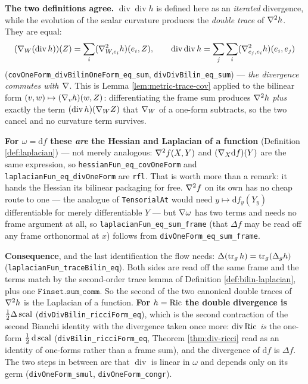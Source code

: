 \begin{definition}
  \textbf{The two definitions agree.} $\operatorname{div}\operatorname{div} h$
  is defined here as an \emph{iterated} divergence, while the evolution of the
  scalar curvature produces the \emph{double trace} of $\nabla^2h$. They are equal:
  \[
    (\nabla_W(\operatorname{div} h))(Z) = \sum_i (\nabla^2_{W,e_i}h)(e_i, Z),
    \qquad
    \operatorname{div}\operatorname{div} h
      = \sum_{j}\sum_i (\nabla^2_{e_j,e_i}h)(e_i, e_j)
  \]
  (\texttt{covOneForm\_divBilinOneForm\_eq\_sum},
  \texttt{divDivBilin\_eq\_sum}) --- \emph{the divergence commutes with
  $\nabla$}. This is Lemma \ref{lem:metric-trace-cov} applied to the bilinear
  form $(v,w) \mapsto (\nabla_v h)(w,Z)$: differentiating the frame sum produces
  $\nabla^2h$ \emph{plus} exactly the term $(\operatorname{div} h)(\nabla_W Z)$
  that $\nabla_W$ of a one-form subtracts, so the two cancel and no curvature
  term survives.

  \textbf{For $\omega = \mathrm{d}f$ these \emph{are} the Hessian and Laplacian
  of a function} (Definition \ref{def:laplacian}) --- not merely analogous:
  $\nabla^2 f(X,Y)$ and $(\nabla_X \mathrm{d}f)(Y)$ are the same expression, so
  \texttt{hessianFun\_eq\_covOneForm} and
  \texttt{laplacianFun\_eq\_divOneForm} are \texttt{rfl}. That is worth more
  than a remark: it hands the Hessian its bilinear packaging for free. $\nabla^2
  f$ on its own has no cheap route to one --- the analogue of
  \texttt{TensorialAt} would need $y \mapsto \mathrm{d}f_y(Y_y)$ differentiable
  for merely differentiable $Y$ --- but $\nabla\omega$ has two terms and needs no
  frame argument at all, so \texttt{laplacianFun\_eq\_sum\_frame} (that
  $\Delta f$ may be read off any frame orthonormal at $x$) follows from
  \texttt{divOneForm\_eq\_sum\_frame}.

  \textbf{Consequence}, and the last identification the flow needs:
  $\Delta(\operatorname{tr}_g h) = \operatorname{tr}_g(\Delta_g h)$
  (\texttt{laplacianFun\_traceBilin\_eq}). Both sides are read off the same
  frame and the terms match by the second-order trace lemma of Definition
  \ref{def:bilin-laplacian}, plus one $\texttt{Finset.sum\_comm}$. So the
  second of the two canonical double traces of $\nabla^2h$ is the Laplacian of a
  function.
  \textbf{For $h = \operatorname{Ric}$ the double divergence is $\tfrac12\Delta\operatorname{scal}$}
  (\texttt{divDivBilin\_ricciForm\_eq}), which is the second contraction of the
  second Bianchi identity with the divergence taken once more:
  $\operatorname{div}\operatorname{Ric}$ \emph{is} the one-form $\tfrac12\,\mathrm{d}\operatorname{scal}$
  (\texttt{divBilin\_ricciForm\_eq}, Theorem \ref{thm:div-ricci} read as an
  identity of one-forms rather than a frame sum), and the divergence of
  $\mathrm{d}f$ is $\Delta f$. The two steps in between are that $\operatorname{div}$
  is linear in $\omega$ and depends only on its germ
  (\texttt{divOneForm\_smul}, \texttt{divOneForm\_congr}).


\end{definition}
